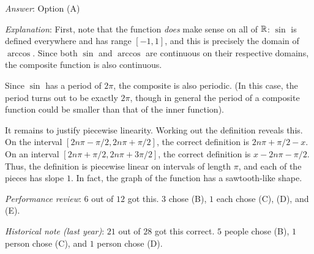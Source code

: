 \documentclass[10pt]{amsart}
\begin{document}
\begin{enumerate}
  {\em Answer}: Option (A)

  {\em Explanation}: First, note that the function {\em does} make
  sense on all of $\mathbb{R}$: $\sin$ is defined everywhere and has range
  $[-1,1]$, and this is precisely the domain of $\arccos$. Since both
  $\sin$ and $\arccos$ are continuous on their respective domains, the
  composite function is also continuous.

  Since $\sin$ has a period of $2\pi$, the composite is also
  periodic. (In this case, the period turns out to be exactly $2\pi$,
  though in general the period of a composite function could be
  smaller than that of the inner function).

  It remains to justify piecewise linearity.  Working out the
  definition reveals this. On the interval $[2n\pi - \pi/2, 2n\pi +
  \pi/2]$, the correct definition is $2n\pi + \pi/2 - x$. On an
  interval $[2n\pi + \pi/2,2n\pi + 3\pi/2]$, the correct definition is
  $x - 2n\pi - \pi/2$. Thus, the definition is piecewise linear on
  intervals of length $\pi$, and each of the pieces has slope $1$. In
  fact, the graph of the function has a sawtooth-like shape.

  {\em Performance review}: $6$ out of $12$ got this. $3$ chose (B),
  $1$ each chose (C), (D), and (E).

  {\em Historical note (last year)}: $21$ out of $28$ got this
  correct. $5$ people chose (B), $1$ person chose (C), and $1$ person
  chose (D).
\end{enumerate}
\end{document}
